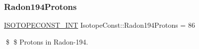 \subsubsection{\texorpdfstring{Radon194\+Protons}{Radon194Protons}}
{\footnotesize\ttfamily \mbox{\hyperlink{group___isotope_const-_macros_ga5f18360b3e99483a35c32d789e62621c}{I\+S\+O\+T\+O\+P\+E\+C\+O\+N\+S\+T\+\_\+\+I\+NT}} Isotope\+Const\+::\+Radon194\+Protons = 86}

\$ \$ Protons in Radon-\/194. 